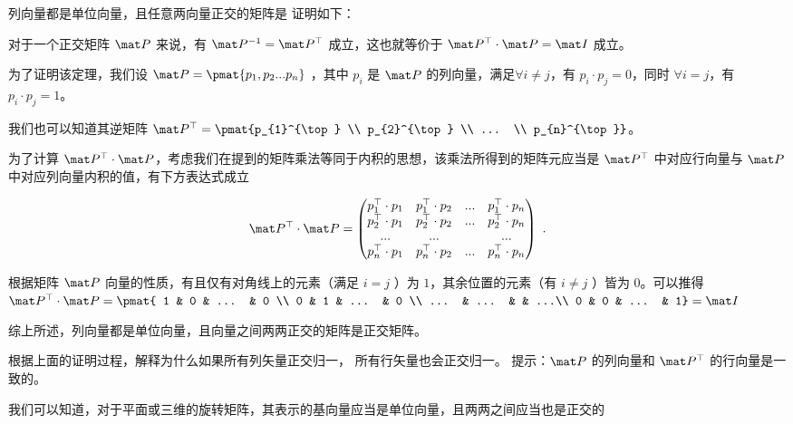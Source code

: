 \begin{theorem}{列向量都是单位向量，且任意两向量正交的矩阵是}
证明如下：

对于一个正交矩阵 $\mat P$ 来说，有 $\mat P^{-1} = \mat P^{\top} $ 成立，这也就等价于 $\mat P^{\top} \cdot \mat P = \mat I$ 成立。

为了证明该定理，我们设 $\mat P = \pmat{p_{1}, p_{2} ... p_{n}}$ ，其中 $p_{i}$ 是 $\mat P$ 的列向量，满足$\forall i \ne j$，有 $p_{i} \cdot p_{j} = 0$，同时 $\forall i = j$，有 $p_{i} \cdot p_{j} = 1$。

我们也可以知道其逆矩阵 $\mat P^{\top} = \pmat{p_{1}^{\top} \\ p_{2}^{\top} \\ ... \\ p_{n}^{\top}}$。

为了计算 $\mat P^{\top} \cdot \mat P$，考虑我们在提到的矩阵乘法等同于内积的思想，该乘法所得到的矩阵元应当是 $\mat P^{\top}$ 中对应行向量与 $\mat P$ 中对应列向量内积的值，有下方表达式成立

\begin{equation}
\mat P^{\top} \cdot \mat P = \begin{pmatrix}
p_{1}^{\top} \cdot p_{1} & p_{1}^{\top} \cdot p_{2} & ... & p_{1}^{\top} \cdot p_{n} \\
p_{2}^{\top} \cdot p_{1} & p_{2}^{\top} \cdot p_{2} & ... & p_{2}^{\top} \cdot p_{n} \\
... & ... &  & ...\\
p_{n}^{\top} \cdot p_{1} & p_{n}^{\top} \cdot p_{2} & ... & p_{n}^{\top} \cdot p_{n}
\end{pmatrix}~.\end{equation}

根据矩阵 $\mat P$ 向量的性质，有且仅有对角线上的元素（满足 $i = j$ ）为 $1$，其余位置的元素（有 $i \ne j$ ）皆为 $0$。可以推得 $\mat P^{\top} \cdot \mat P = 
\pmat{
1 & 0 & ... & 0 \\
0 & 1 & ... & 0 \\
... & ... &  & ...\\
0 & 0 & ... & 1} = \mat I$

综上所述，列向量都是单位向量，且向量之间两两正交的矩阵是正交矩阵。

\end{theorem}

\begin{exercise}{根据上面的证明过程，解释为什么如果所有列矢量正交归一， 所有行矢量也会正交归一。}
提示：$\mat P$ 的列向量和 $\mat P^{\top}$ 的行向量是一致的。
\end{exercise}

我们可以知道，对于平面或三维的旋转矩阵，其表示的基向量应当是单位向量，且两两之间应当也是正交的



